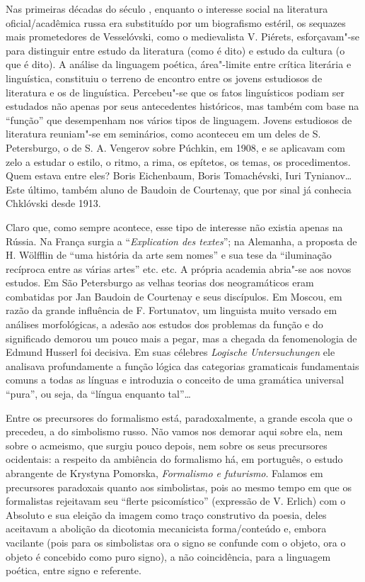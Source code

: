 Nas primeiras décadas do século , enquanto o interesse social na
literatura oficial/acadêmica russa era substituído por um biografismo
estéril, os sequazes mais prometedores de Vesselóvski, como o
medievalista V. Piérets, esforçavam"-se para distinguir entre estudo da
literatura (como é dito) e estudo da cultura (o que é dito). A análise
da linguagem poética, área"-limite entre crítica literária e linguística,
constituiu o terreno de encontro entre os jovens estudiosos de
literatura e os de linguística. Percebeu"-se que os fatos linguísticos
podiam ser estudados não apenas por seus antecedentes históricos, mas
também com base na ``função'' que desempenham nos vários tipos de
linguagem. Jovens estudiosos de literatura reuniam"-se em seminários,
como aconteceu em um deles de S. Petersburgo, o de S. A. Vengerov sobre
Púchkin, em 1908, e se aplicavam com zelo a estudar o estilo, o ritmo, a
rima, os epítetos, os temas, os procedimentos. Quem estava entre eles?
Boris Eichenbaum, Boris Tomachévski, Iuri Tynianov\ldots{} Este último,
também aluno de Baudoin de Courtenay, que por sinal já conhecia
Chklóvski desde 1913.

Claro que, como sempre acontece, esse tipo de interesse não existia
apenas na Rússia. Na França surgia a ``\emph{Explication des textes}'';
na Alemanha, a proposta de H. Wölfflin de ``uma história da arte sem
nomes'' e sua tese da ``iluminação recíproca entre as várias artes''
etc. etc. A própria academia abria"-se aos novos estudos. Em São
Petersburgo as velhas teorias dos neogramáticos eram combatidas por Jan
Baudoin de Courtenay e seus discípulos. Em Moscou, em razão da grande
influência de F. Fortunatov, um linguista muito versado em análises
morfológicas, a adesão aos estudos dos problemas da função e do
significado demorou um pouco mais a pegar, mas a chegada da
fenomenologia de Edmund Husserl foi decisiva. Em suas célebres
\emph{Logische} \emph{Untersuchungen} ele analisava profundamente a
função lógica das categorias gramaticais fundamentais comuns a todas as
línguas e introduzia o conceito de uma gramática universal ``pura'', ou
seja, da ``língua enquanto tal''\ldots{}

Entre os precursores do formalismo está, paradoxalmente, a grande escola
que o precedeu, a do simbolismo russo. Não vamos nos demorar aqui sobre
ela, nem sobre o acmeismo, que surgiu pouco depois, nem sobre os seus
precursores ocidentais: a respeito da ambiência do formalismo há, em
português, o estudo abrangente de Krystyna Pomorska, \emph{Formalismo e
futurismo}. Falamos em precursores paradoxais quanto aos simbolistas,
pois ao mesmo tempo em que os formalistas rejeitavam seu ``flerte
psicomístico'' (expressão de V. Erlich) com o Absoluto e sua eleição da
imagem como traço construtivo da poesia, deles aceitavam a abolição da
dicotomia mecanicista forma/conteúdo e, embora vacilante (pois para os
simbolistas ora o signo se confunde com o objeto, ora o objeto é
concebido como puro signo), a não coincidência, para a linguagem
poética, entre signo e referente.

